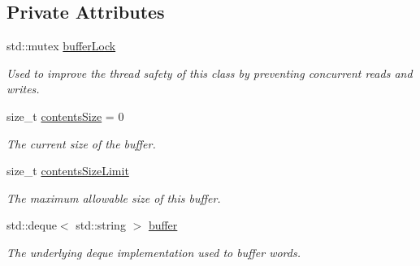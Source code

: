 \subsection*{Private Attributes}
\begin{DoxyCompactItemize}
\item 
\mbox{\label{class_aws_1_1_iot_1_1_device_client_1_1_jobs_1_1_limited_stream_buffer_a2ef7054bf63c3809a9c85af48418ca53}} 
std\+::mutex \hyperlink{class_aws_1_1_iot_1_1_device_client_1_1_jobs_1_1_limited_stream_buffer_a2ef7054bf63c3809a9c85af48418ca53}{buffer\+Lock}
\begin{DoxyCompactList}\small\item\em Used to improve the thread safety of this class by preventing concurrent reads and writes. \end{DoxyCompactList}\item 
\mbox{\label{class_aws_1_1_iot_1_1_device_client_1_1_jobs_1_1_limited_stream_buffer_acbbbbe06bc7b9bf293a3fd6710a94d1a}} 
size\+\_\+t \hyperlink{class_aws_1_1_iot_1_1_device_client_1_1_jobs_1_1_limited_stream_buffer_acbbbbe06bc7b9bf293a3fd6710a94d1a}{contents\+Size} = 0
\begin{DoxyCompactList}\small\item\em The current size of the buffer. \end{DoxyCompactList}\item 
\mbox{\label{class_aws_1_1_iot_1_1_device_client_1_1_jobs_1_1_limited_stream_buffer_abe31825292542ae742ce4ba8b8b29a4f}} 
size\+\_\+t \hyperlink{class_aws_1_1_iot_1_1_device_client_1_1_jobs_1_1_limited_stream_buffer_abe31825292542ae742ce4ba8b8b29a4f}{contents\+Size\+Limit}
\begin{DoxyCompactList}\small\item\em The maximum allowable size of this buffer. \end{DoxyCompactList}\item 
\mbox{\label{class_aws_1_1_iot_1_1_device_client_1_1_jobs_1_1_limited_stream_buffer_af0b1176b7d46b34764fdcf77f35d2b7c}} 
std\+::deque$<$ std\+::string $>$ \hyperlink{class_aws_1_1_iot_1_1_device_client_1_1_jobs_1_1_limited_stream_buffer_af0b1176b7d46b34764fdcf77f35d2b7c}{buffer}
\begin{DoxyCompactList}\small\item\em The underlying deque implementation used to buffer words. \end{DoxyCompactList}\end{DoxyCompactItemize}


